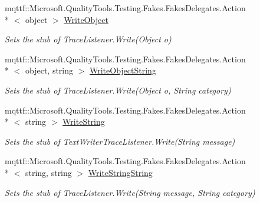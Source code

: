 \begin{DoxyCompactItemize}
mqttf\-::\-Microsoft.\-Quality\-Tools.\-Testing.\-Fakes.\-Fakes\-Delegates.\-Action\\*
$<$ object $>$ \hyperlink{class_system_1_1_diagnostics_1_1_fakes_1_1_stub_console_trace_listener_a44e3e474f23585a57b0cc1c1a6db0a92}{Write\-Object}
\begin{DoxyCompactList}\small\item\em Sets the stub of Trace\-Listener.\-Write(\-Object o)\end{DoxyCompactList}\item 
mqttf\-::\-Microsoft.\-Quality\-Tools.\-Testing.\-Fakes.\-Fakes\-Delegates.\-Action\\*
$<$ object, string $>$ \hyperlink{class_system_1_1_diagnostics_1_1_fakes_1_1_stub_console_trace_listener_a09eed87eacb12cc42b1e7ca6fd3abc4c}{Write\-Object\-String}
\begin{DoxyCompactList}\small\item\em Sets the stub of Trace\-Listener.\-Write(\-Object o, String category)\end{DoxyCompactList}\item 
mqttf\-::\-Microsoft.\-Quality\-Tools.\-Testing.\-Fakes.\-Fakes\-Delegates.\-Action\\*
$<$ string $>$ \hyperlink{class_system_1_1_diagnostics_1_1_fakes_1_1_stub_console_trace_listener_a3664fe514ef43976960e32dd48a53788}{Write\-String}
\begin{DoxyCompactList}\small\item\em Sets the stub of Text\-Writer\-Trace\-Listener.\-Write(\-String message)\end{DoxyCompactList}\item 
mqttf\-::\-Microsoft.\-Quality\-Tools.\-Testing.\-Fakes.\-Fakes\-Delegates.\-Action\\*
$<$ string, string $>$ \hyperlink{class_system_1_1_diagnostics_1_1_fakes_1_1_stub_console_trace_listener_acef06285e470e0404b85c5b47d6140ac}{Write\-String\-String}
\begin{DoxyCompactList}\small\item\em Sets the stub of Trace\-Listener.\-Write(\-String message, String category)\end{DoxyCompactList}\end{DoxyCompactItemize}
